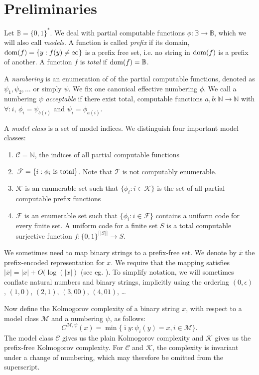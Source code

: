 \documentclass{style/llncs}
\newcommand{\M}{\mathscr M}
\newcommand{\C}{\mathscr C}
\newcommand{\T}{\mathscr T}
\newcommand{\F}{\mathscr F}
\newcommand{\K}{\mathscr K}
\newcommand{\B}{\mathbb B}
\newcommand{\N}{\mathbb N}
\newcommand{\tn}[1]{\textnormal{#1}}
\newcommand{\br}[1]{\overline{#1}}
\newcommand{\dom}[1]{\mathop{\tn{dom}(#1)}}
\begin{document}
\section{Preliminaries}
Let $\B = \{0,1\}^*$. We deal with partial computable functions $\phi: \B \to \B$, which we will also call \emph{models}. A function is called \emph{prefix} if its domain, $\dom{f} = \{y : f(y) \neq \infty\}$ is a prefix free set, i.e. no string in $\dom{f}$ is a prefix of another. A function $f$ is \emph{total} if $\dom{f} = \B$.

A \emph{numbering} is an enumeration of of the partial computable functions, denoted as $\psi_1, \psi_2, \ldots$ or simply $\psi$. We fix one canonical effective numbering $\phi$. We call a numbering $\psi$ \emph{acceptable} if there exist total, computable functions $a, b: \N \to \N$ with $\forall: i$, $\phi_i = \psi_{b(i)}$ and  $\psi_i = \phi_{a(i)}$.

A \emph{model class} is a set of model indices. We distinguish four important model classes: 
\begin{enumerate}
\item $\C=\N$, the indices of all partial computable functions
\item $\T=\{i:\tn{$\phi_i$ is total}\}$. Note that $\T$ is not computably enumerable.
\item $\K$ is an enumerable set such that $\{\phi_i:i\in\K\}$ is the set of all partial computable prefix functions
\item $\F$ is an enumerable set such that $\{\phi_i:i\in\F\}$ contains a uniform code for every finite set. A uniform code for a finite set $S$ is a total computable surjective function $f:\{0,1\}^{\lceil|S|\rceil}\to S$.
\end{enumerate}
We sometimes need to map binary strings to a prefix-free set. We denote by $\br{x}$ the prefix-encoded representation for $x$. We require that the mapping satisfies $|\br{x}| = |x|+O(\log(|x|)$ (see eg. \cite[Section~1.4]{li1993introduction}). To simplify notation, we will sometimes conflate natural numbers and binary strings, implicitly using the ordering $(0, \epsilon)$, $(1, 0)$, $(2, 1)$, $(3, 00)$, $(4, 01)$, \ldots

Now define the Kolmogorov complexity of a binary string $x$, with respect to a model class $\M$ and a numbering $\psi$, as follows:
\[
C^{\M,\psi}(x)=\min\{\bar\imath y:\psi_i(y)=x,i\in\M\}.
\]
The model class $\C$ gives us the plain Kolmogorov complexity and $\K$ gives us the prefix-free Kolmogorov complexity. For $\C$ and $\K$, the complexity is invariant under a change of numbering, which may therefore be omitted from the superscript.
\end{document}
